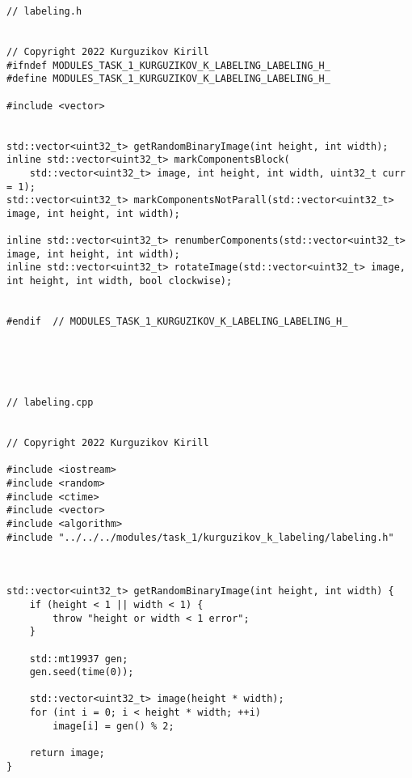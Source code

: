 \documentclass{report}
\begin{document}
\begin{lstlisting}
// labeling.h


// Copyright 2022 Kurguzikov Kirill
#ifndef MODULES_TASK_1_KURGUZIKOV_K_LABELING_LABELING_H_
#define MODULES_TASK_1_KURGUZIKOV_K_LABELING_LABELING_H_

#include <vector>


std::vector<uint32_t> getRandomBinaryImage(int height, int width);
inline std::vector<uint32_t> markComponentsBlock(
    std::vector<uint32_t> image, int height, int width, uint32_t curr = 1);
std::vector<uint32_t> markComponentsNotParall(std::vector<uint32_t> image, int height, int width);

inline std::vector<uint32_t> renumberComponents(std::vector<uint32_t> image, int height, int width);
inline std::vector<uint32_t> rotateImage(std::vector<uint32_t> image, int height, int width, bool clockwise);


#endif  // MODULES_TASK_1_KURGUZIKOV_K_LABELING_LABELING_H_





// labeling.cpp


// Copyright 2022 Kurguzikov Kirill

#include <iostream>
#include <random>
#include <ctime>
#include <vector>
#include <algorithm>
#include "../../../modules/task_1/kurguzikov_k_labeling/labeling.h"



std::vector<uint32_t> getRandomBinaryImage(int height, int width) {
    if (height < 1 || width < 1) {
        throw "height or width < 1 error";
    }

    std::mt19937 gen;
    gen.seed(time(0));

    std::vector<uint32_t> image(height * width);
    for (int i = 0; i < height * width; ++i)
        image[i] = gen() % 2;

    return image;
}


\end{lstlisting}
\end{document}
